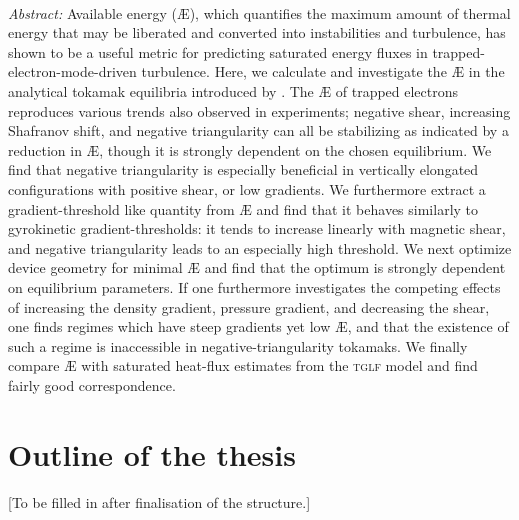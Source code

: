  \\
\textit{Abstract:} Available energy (\AE{}), which quantifies the maximum amount of thermal energy that may be liberated and converted into instabilities and turbulence, has shown to be a useful metric for predicting saturated energy fluxes in trapped-electron-mode-driven turbulence. Here, we calculate and investigate the \AE{} in the analytical tokamak equilibria introduced by \citet{miller1998noncircular}. The \AE{} of trapped electrons reproduces various trends also observed in experiments; negative shear, increasing Shafranov shift, and negative triangularity can all be stabilizing as indicated by a reduction in \AE{}, though it is strongly dependent on the chosen equilibrium. We find that negative triangularity is especially beneficial in vertically elongated configurations with positive shear, or low gradients. We furthermore extract a gradient-threshold like quantity from \AE{} and find that it behaves similarly to gyrokinetic gradient-thresholds: it tends to increase linearly with magnetic shear, and negative triangularity leads to an especially high threshold. We next optimize device geometry for minimal \AE{} and find that the optimum is strongly dependent on equilibrium parameters. If one furthermore investigates the competing effects of increasing the density gradient, pressure gradient, and decreasing the shear, one finds regimes which have steep gradients yet low \AE{}, and that the existence of such a regime is inaccessible in negative-triangularity tokamaks. We finally compare \AE{} with saturated heat-flux estimates from the \textsc{tglf} model and find fairly good correspondence.


\section{Outline of the thesis}
[To be filled in after finalisation of the structure.]

